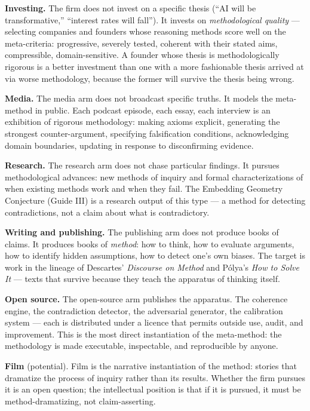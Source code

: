 \documentclass[11pt,letterpaper]{article}
\begin{document}
\textbf{Investing.} The firm does not invest on a specific thesis (``AI will be transformative,'' ``interest rates will fall''). It invests on \emph{methodological quality} --- selecting companies and founders whose reasoning methods score well on the meta-criteria: progressive, severely tested, coherent with their stated aims, compressible, domain-sensitive. A founder whose thesis is methodologically rigorous is a better investment than one with a more fashionable thesis arrived at via worse methodology, because the former will survive the thesis being wrong.

\textbf{Media.} The media arm does not broadcast specific truths. It models the meta-method in public. Each podcast episode, each essay, each interview is an exhibition of rigorous methodology: making axioms explicit, generating the strongest counter-argument, specifying falsification conditions, acknowledging domain boundaries, updating in response to disconfirming evidence.

\textbf{Research.} The research arm does not chase particular findings. It pursues methodological advances: new methods of inquiry and formal characterizations of when existing methods work and when they fail. The Embedding Geometry Conjecture (Guide III) is a research output of this type --- a method for detecting contradictions, not a claim about what is contradictory.

\textbf{Writing and publishing.} The publishing arm does not produce books of claims. It produces books of \emph{method}: how to think, how to evaluate arguments, how to identify hidden assumptions, how to detect one's own biases. The target is work in the lineage of Descartes' \textit{Discourse on Method} and P\'olya's \textit{How to Solve It} --- texts that survive because they teach the apparatus of thinking itself.

\textbf{Open source.} The open-source arm publishes the apparatus. The coherence engine, the contradiction detector, the adversarial generator, the calibration system --- each is distributed under a licence that permits outside use, audit, and improvement. This is the most direct instantiation of the meta-method: the methodology is made executable, inspectable, and reproducible by anyone.

\textbf{Film} (potential). Film is the narrative instantiation of the method: stories that dramatize the process of inquiry rather than its results. Whether the firm pursues it is an open question; the intellectual position is that if it is pursued, it must be method-dramatizing, not claim-asserting.
\end{document}
